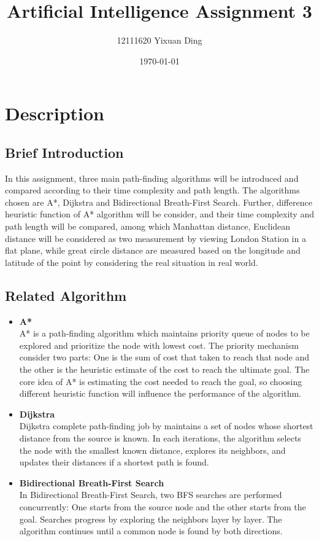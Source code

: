 \documentclass{article}
\begin{document}
	
	\title{Artificial Intelligence Assignment 3}
	\author{12111620 Yixuan Ding}
	\date{\today}
	
	\maketitle
	
	\section*{Description}
	\subsection*{Brief Introduction}
	In this assignment, three main path-finding algorithms will be introduced and compared according to their time complexity and path length. The algorithms chosen are A*, Dijkstra and Bidirectional Breath-First Search. Further, difference heuristic function of A* algorithm will be consider, and their time complexity and path length will be compared, among which Manhattan distance, Euclidean distance will be considered as two measurement by viewing London Station in a flat plane, while great circle distance are measured based on the longitude and latitude of the point by considering the real situation in real world.
	
	\subsection*{Related Algorithm}
	\begin{itemize}
		\item \textbf{A*}\\
		A* is a path-finding algorithm which maintains priority queue of nodes to be explored and prioritize the node with lowest cost. The priority mechanism consider two parts: One is the sum of cost that taken to reach that node and the other is the heuristic estimate of the cost to reach the ultimate goal. The core idea of A* is estimating the cost needed to reach the goal, so choosing different heuristic function will influence the performance of the algorithm.
		\item \textbf{Dijkstra}\\
		Dijkstra complete path-finding job by maintains a set of nodes whose shortest distance from the source is known. In each iterations, the algorithm selects the node with the smallest known distance, explores its neighbors, and updates their distances if a shortest path is found.
		\item \textbf{Bidirectional Breath-First Search}\\
		In Bidirectional Breath-First Search, two BFS searches are performed concurrently: One starts from the source node and the other starts from the goal. Searches progress by exploring the neighbors layer by layer. The algorithm continues until a common node is found by both directions.
	\end{itemize}
	
\end{document}
